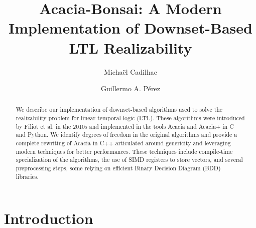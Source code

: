 \documentclass[sigconf,screen,nonacm]{acmart}
\begin{document}
\title{Acacia-Bonsai: A Modern Implementation of Downset-Based LTL Realizability}

\author{Michaël Cadilhac}

\author{Guillermo A. Pérez}

\begin{abstract}
  We describe our implementation of downset-based algorithms used to solve the
  realizability problem for linear temporal logic (LTL).  These algorithms were
  introduced by Filiot et al. in the 2010s and implemented in the tools Acacia
  and Acacia+ in C and Python.  We identify degrees of freedom in the original
  algorithms and provide a complete rewriting of Acacia in C++ articulated
  around genericity and leveraging modern techniques for better performances.
  These techniques include compile-time specialization of the algorithms, the
  use of SIMD registers to store vectors, and several preprocessing steps, some
  relying on efficient Binary Decision Diagram (BDD) libraries.
\end{abstract}


\maketitle

\section{Introduction}

\end{document}
